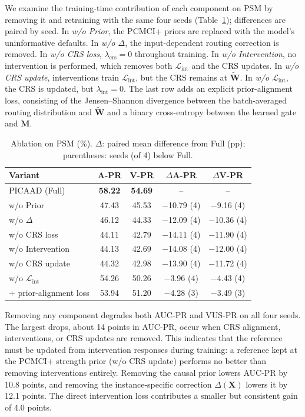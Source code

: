 \documentclass[letterpaper]{article}
\newcommand{\Wt}{\widetilde{\mathbf{W}}}
\begin{document}
We examine the training-time contribution of each component on PSM by removing it and retraining with the same four seeds (Table~\ref{tab:ablation}); differences are paired by seed. In \emph{w/o Prior}, the PCMCI+ priors are replaced with the model's uninformative defaults. In \emph{w/o $\Delta$}, the input-dependent routing correction is removed. In \emph{w/o CRS loss}, $\lambda_{\mathrm{crs}}=0$ throughout training. In \emph{w/o Intervention}, no intervention is performed, which removes both $\mathcal{L}_{\mathrm{int}}$ and the CRS updates. In \emph{w/o CRS update}, interventions train $\mathcal{L}_{\mathrm{int}}$, but the CRS remains at $\Wt$. In \emph{w/o $\mathcal{L}_{\mathrm{int}}$}, the CRS is updated, but $\lambda_{\mathrm{int}}=0$. The last row adds an explicit prior-alignment loss, consisting of the Jensen--Shannon divergence between the batch-averaged routing distribution and $\Wt$ and a binary cross-entropy between the learned gate and $\mathbf{M}$.

\begin{table}[t]
\centering
\caption{Ablation on PSM (\%). $\Delta$: paired mean difference from Full (pp); parentheses: seeds (of 4) below Full.}
\label{tab:ablation}
\small
\setlength{\tabcolsep}{3pt}
\begin{tabular}{lcccc}
\toprule
Variant & A-PR & V-PR & $\Delta$A-PR & $\Delta$V-PR \\
\midrule
PICAAD (Full)                    & \textbf{58.22} & \textbf{54.69} & --           & --           \\
w/o Prior                        & 47.43 & 45.53 & $-$10.79 (4) & $-$9.16 (4)  \\
w/o $\Delta$                     & 46.12 & 44.33 & $-$12.09 (4) & $-$10.36 (4) \\
w/o CRS loss                     & 44.11 & 42.79 & $-$14.11 (4) & $-$11.90 (4) \\
w/o Intervention                 & 44.13 & 42.69 & $-$14.08 (4) & $-$12.00 (4) \\
w/o CRS update                   & 44.32 & 42.98 & $-$13.90 (4) & $-$11.72 (4) \\
w/o $\mathcal{L}_{\mathrm{int}}$ & 54.26 & 50.26 & $-$3.96 (4)  & $-$4.43 (4)  \\
\midrule
+ prior-alignment loss           & 53.94 & 51.20 & $-$4.28 (3)  & $-$3.49 (3)  \\
\bottomrule
\end{tabular}
\end{table}

Removing any component degrades both AUC-PR and VUS-PR on all four seeds. The largest drops, about 14 points in AUC-PR, occur when CRS alignment, interventions, or CRS updates are removed. This indicates that the reference must be updated from intervention responses during training: a reference kept at the PCMCI+ strength prior (w/o CRS update) performs no better than removing interventions entirely. Removing the causal prior lowers AUC-PR by 10.8 points, and removing the instance-specific correction $\Delta(\mathbf{X})$ lowers it by 12.1 points. The direct intervention loss contributes a smaller but consistent gain of 4.0 points.
\end{document}
